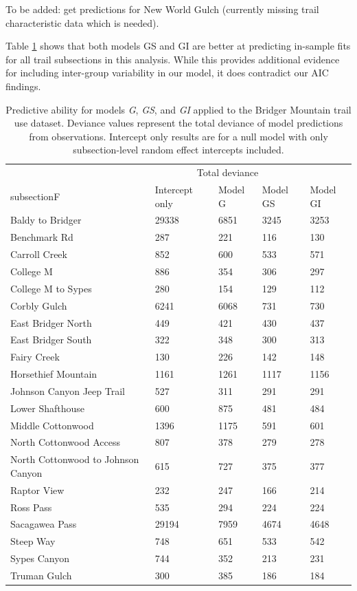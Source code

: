 \documentclass[
]{book}
\begin{document}
To be added: get predictions for New World Gulch (currently missing trail characteristic data which is needed).

Table \ref{tab:deviance-kable} shows that both models GS and GI are better at predicting in-sample fits for all trail subsections in this analysis. While this provides additional evidence for including inter-group variability in our model, it does contradict our AIC findings.

\begin{table}

\caption{\label{tab:deviance-kable}Predictive ability for models \emph{G}, \emph{GS}, and \emph{GI} applied to the Bridger Mountain trail use dataset. Deviance values represent the total deviance of model predictions from observations. Intercept only results are for a null model with only subsection-level random effect intercepts included.}
\centering
\begin{tabular}[t]{lllll}
\toprule
\multicolumn{1}{c}{ } & \multicolumn{3}{c}{Total deviance} \\
\cmidrule(l{3pt}r{3pt}){2-4}
subsectionF & Intercept only & Model G & Model GS & Model GI\\
\midrule
Baldy to Bridger & 29338 & 6851 & 3245 & 3253\\
Benchmark Rd & 287 & 221 & 116 & 130\\
Carroll Creek & 852 & 600 & 533 & 571\\
College M & 886 & 354 & 306 & 297\\
College M to Sypes & 280 & 154 & 129 & 112\\
\addlinespace
Corbly Gulch & 6241 & 6068 & 731 & 730\\
East Bridger North & 449 & 421 & 430 & 437\\
East Bridger South & 322 & 348 & 300 & 313\\
Fairy Creek & 130 & 226 & 142 & 148\\
Horsethief Mountain & 1161 & 1261 & 1117 & 1156\\
\addlinespace
Johnson Canyon Jeep Trail & 527 & 311 & 291 & 291\\
Lower Shafthouse & 600 & 875 & 481 & 484\\
Middle Cottonwood & 1396 & 1175 & 591 & 601\\
North Cottonwood Access & 807 & 378 & 279 & 278\\
North Cottonwood to Johnson Canyon & 615 & 727 & 375 & 377\\
\addlinespace
Raptor View & 232 & 247 & 166 & 214\\
Ross Pass & 535 & 294 & 224 & 224\\
Sacagawea Pass & 29194 & 7959 & 4674 & 4648\\
Steep Way & 748 & 651 & 533 & 542\\
Sypes Canyon & 744 & 352 & 213 & 231\\
\addlinespace
Truman Gulch & 300 & 385 & 186 & 184\\
\bottomrule
\end{tabular}
\end{table}
\end{document}
